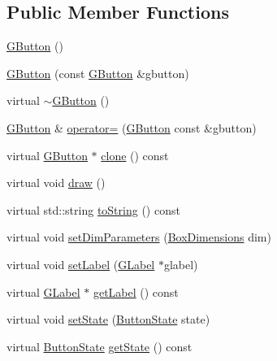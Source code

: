 \subsection*{Public Member Functions}
\begin{DoxyCompactItemize}
\item 
\hyperlink{classOpenViBEApplications_1_1GButton_a423672527ee0510fe9b1f78b62c5b573}{GButton} ()
\item 
\hyperlink{classOpenViBEApplications_1_1GButton_ab0665fd19be1233eca19587ad51702be}{GButton} (const \hyperlink{classOpenViBEApplications_1_1GButton}{GButton} \&gbutton)
\item 
virtual \hyperlink{classOpenViBEApplications_1_1GButton_adae8d580e96fc94a2c84930eb3178b70}{$\sim$GButton} ()
\item 
\hyperlink{classOpenViBEApplications_1_1GButton}{GButton} \& \hyperlink{classOpenViBEApplications_1_1GButton_aaa56a2e2f576593dff06f3515020fd14}{operator=} (\hyperlink{classOpenViBEApplications_1_1GButton}{GButton} const \&gbutton)
\item 
virtual \hyperlink{classOpenViBEApplications_1_1GButton}{GButton} $\ast$ \hyperlink{classOpenViBEApplications_1_1GButton_afa3ac2d6060125071494d6abecabd19e}{clone} () const 
\item 
virtual void \hyperlink{classOpenViBEApplications_1_1GButton_abde44c49c9f5ab97d7398864ff15969d}{draw} ()
\item 
virtual std::string \hyperlink{classOpenViBEApplications_1_1GButton_a963ce207a2936305b251e3cbf30a406c}{toString} () const 
\item 
virtual void \hyperlink{classOpenViBEApplications_1_1GButton_acae80df7373e4fdd46165e4822511d9d}{setDimParameters} (\hyperlink{structOpenViBEApplications_1_1__BoxDimensions}{BoxDimensions} dim)
\item 
virtual void \hyperlink{classOpenViBEApplications_1_1GButton_a592d569f121bcf3c449b70b5b836a28e}{setLabel} (\hyperlink{classOpenViBEApplications_1_1GLabel}{GLabel} $\ast$glabel)
\item 
virtual \hyperlink{classOpenViBEApplications_1_1GLabel}{GLabel} $\ast$ \hyperlink{classOpenViBEApplications_1_1GButton_a8c57a786686428590e0121ddec1ff0c8}{getLabel} () const 
\item 
virtual void \hyperlink{classOpenViBEApplications_1_1GButton_a0197e3f226c0bdac3be8437091948356}{setState} (\hyperlink{namespaceOpenViBEApplications_a4b71ded51609d9643a2256d0479f0bd4}{ButtonState} state)
\item 
virtual \hyperlink{namespaceOpenViBEApplications_a4b71ded51609d9643a2256d0479f0bd4}{ButtonState} \hyperlink{classOpenViBEApplications_1_1GButton_a1909ce68759714d2275b3dcc04b51b5e}{getState} () const 

\end{DoxyCompactItemize}
